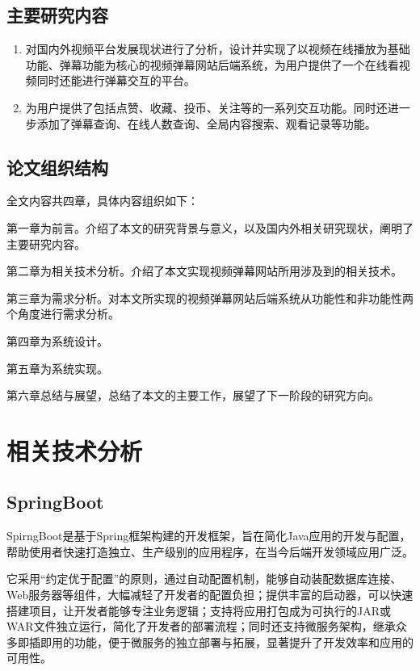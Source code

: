 \subsection{主要研究内容}

\begin{enumerate}[label=(\arabic*)]
    \item 对国内外视频平台发展现状进行了分析，设计并实现了以视频在线播放为基础功能、弹幕功能为核心的视频弹幕网站后端系统，为用户提供了一个在线看视频同时还能进行弹幕交互的平台。
    \label{系统目标}
    \item 为用户提供了包括点赞、收藏、投币、关注等的一系列交互功能。同时还进一步添加了弹幕查询、在线人数查询、全局内容搜索、观看记录等功能。
    \end{enumerate}

\subsection{论文组织结构}

全文内容共四章，具体内容组织如下：

第一章为前言。介绍了本文的研究背景与意义，以及国内外相关研究现状，阐明了主要研究内容。

第二章为相关技术分析。介绍了本文实现视频弹幕网站所用涉及到的相关技术。

第三章为需求分析。对本文所实现的视频弹幕网站后端系统从功能性和非功能性两个角度进行需求分析。

第四章为系统设计。

第五章为系统实现。

第六章总结与展望，总结了本文的主要工作，展望了下一阶段的研究方向。

\newpage

\section{相关技术分析}
\subsection{SpringBoot}

SpirngBoot是基于Spring框架构建的开发框架，旨在简化Java应用的开发与配置，帮助使用者快速打造独立、生产级别的应用程序，在当今后端开发领域应用广泛。

它采用“约定优于配置”的原则，通过自动配置机制，能够自动装配数据库连接、Web服务器等组件，大幅减轻了开发者的配置负担；提供丰富的启动器，可以快速搭建项目，让开发者能够专注业务逻辑；支持将应用打包成为可执行的JAR或WAR文件独立运行，简化了开发者的部署流程；同时还支持微服务架构，继承众多即插即用的功能，便于微服务的独立部署与拓展，显著提升了开发效率和应用的可用性。

